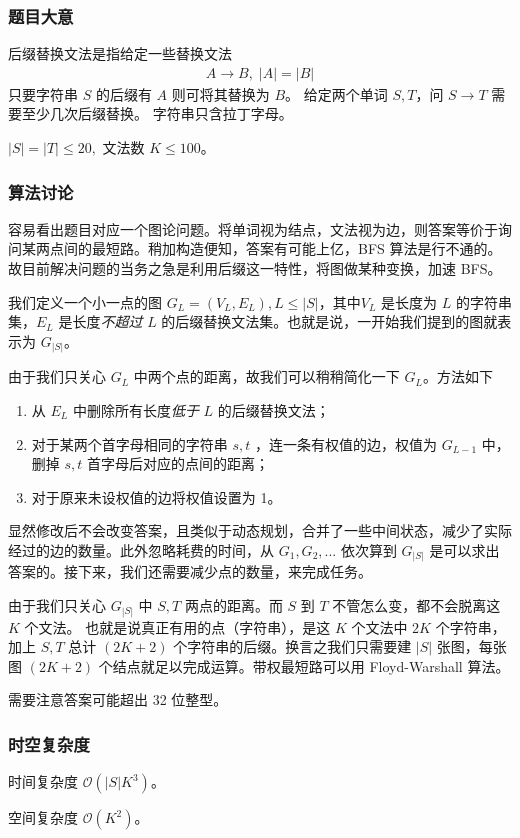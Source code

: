 			\subsubsection{题目大意}
				后缀替换文法是指给定一些替换文法
				\begin{align}
					A \rightarrow B, \; |A| = |B|
				\end{align}
				只要字符串 $S$ 的后缀有 $A$ 则可将其替换为 $B$。		
				给定两个单词 $S, T$，问		$S \rightarrow T$ 需要至少几次后缀替换。 字符串只含拉丁字母。
				
				$|S| = |T| \le 20, $ 文法数 $ K \le 100$。
			\subsubsection{算法讨论}	
				容易看出题目对应一个图论问题。将单词视为结点，文法视为边，则答案等价于询问某两点间的最短路。稍加构造便知，答案有可能上亿，BFS 算法是行不通的。故目前解决问题的当务之急是利用后缀这一特性，将图做某种变换，加速 BFS。
				
				我们定义一个小一点的图 $G_L = (V_L, E_L), L \le |S|$，其中$V_L$ 是长度为 $L$ 的字符串集，$E_L$ 是长度\emph{不超过} $L$ 的后缀替换文法集。也就是说，一开始我们提到的图就表示为 $G_{|S|}$。
				
				由于我们只关心  $G_L $ 中两个点的距离，故我们可以稍稍简化一下  $G_L$。方法如下
				\begin{enumerate}
					\item 从 $E_L$ 中删除所有长度\emph{低于} $L$ 的后缀替换文法；
					\item 对于某两个首字母相同的字符串 $s, t$ ，连一条有权值的边，权值为 $G_{L - 1}$ 中，删掉 $s, t$ 首字母后对应的点间的距离；
					\item 对于原来未设权值的边将权值设置为 1。
				\end{enumerate}
				显然修改后不会改变答案，且类似于动态规划，合并了一些中间状态，减少了实际经过的边的数量。此外忽略耗费的时间，从 $G_1, G_2, ...$ 依次算到 $G_|S|$ 是可以求出答案的。接下来，我们还需要减少点的数量，来完成任务。
				
				由于我们只关心 $G_{|S|}$ 中 $S, T$ 两点的距离。而 $S $ 到 $ T$ 不管怎么变，都不会脱离这 $K$ 个文法。
				也就是说真正有用的点（字符串），是这  $K$ 个文法中 $2 K$ 个字符串，加上 $S, T$ 总计 $(2 K + 2)$ 个字符串的后缀。换言之我们只需要建 $|S|$ 张图，每张图 $(2 K + 2)$  个结点就足以完成运算。带权最短路可以用 Floyd-Warshall 算法。
				
				需要注意答案可能超出 32 位整型。
			\subsubsection{时空复杂度}
				时间复杂度 $\mathcal{O}\left(|S| K^3 \right)$。
					
				空间复杂度 $\mathcal{O}\left(K^2 \right)$。
		\newpage
